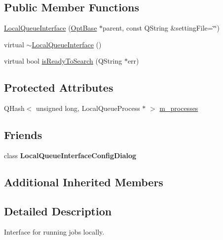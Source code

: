 \subsection*{Public Member Functions}
\begin{DoxyCompactItemize}
\item 
\hyperlink{classGlobalSearch_1_1LocalQueueInterface_ae1188c7950216c209249923050410489}{Local\+Queue\+Interface} (\hyperlink{classGlobalSearch_1_1OptBase}{Opt\+Base} $\ast$parent, const Q\+String \&setting\+File=\char`\"{}\char`\"{})
\item 
virtual \hyperlink{classGlobalSearch_1_1LocalQueueInterface_a1749a7451caa140ecd6cc244a5117f99}{$\sim$\+Local\+Queue\+Interface} ()
\item 
virtual bool \hyperlink{classGlobalSearch_1_1LocalQueueInterface_ab414f1b5b47610e45fece054512566ed}{is\+Ready\+To\+Search} (Q\+String $\ast$err)
\end{DoxyCompactItemize}
\subsection*{Protected Attributes}
\begin{DoxyCompactItemize}
\item 
Q\+Hash$<$ unsigned long, Local\+Queue\+Process $\ast$ $>$ \hyperlink{classGlobalSearch_1_1LocalQueueInterface_a7a7326a16048896fd7c88d17e3973cda}{m\+\_\+processes}
\end{DoxyCompactItemize}
\subsection*{Friends}
\begin{DoxyCompactItemize}
\item 
\hypertarget{classGlobalSearch_1_1LocalQueueInterface_aa3688f9c489918804f3ee222a3a9f028}{}class {\bfseries Local\+Queue\+Interface\+Config\+Dialog}\label{classGlobalSearch_1_1LocalQueueInterface_aa3688f9c489918804f3ee222a3a9f028}

\end{DoxyCompactItemize}
\subsection*{Additional Inherited Members}


\subsection{Detailed Description}
Interface for running jobs locally. 

